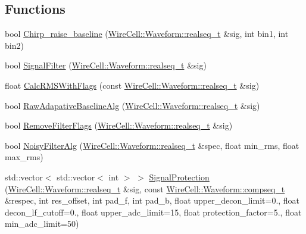 \subsection*{Functions}
\begin{DoxyCompactItemize}
\item 
bool \hyperlink{namespace_wire_cell_1_1_sig_proc_1_1_microboone_a16d44a6eccccc47fd7f7967b37f8ba61}{Chirp\+\_\+raise\+\_\+baseline} (\hyperlink{namespace_wire_cell_1_1_waveform_a479175e541c8545e87cd8063b74b6956}{Wire\+Cell\+::\+Waveform\+::realseq\+\_\+t} \&sig, int bin1, int bin2)
\item 
bool \hyperlink{namespace_wire_cell_1_1_sig_proc_1_1_microboone_a09348aad9dc69ef1d18d6145b03547ee}{Signal\+Filter} (\hyperlink{namespace_wire_cell_1_1_waveform_a479175e541c8545e87cd8063b74b6956}{Wire\+Cell\+::\+Waveform\+::realseq\+\_\+t} \&sig)
\item 
float \hyperlink{namespace_wire_cell_1_1_sig_proc_1_1_microboone_ae364f8dbc0dad92d515850a86baefb13}{Calc\+R\+M\+S\+With\+Flags} (const \hyperlink{namespace_wire_cell_1_1_waveform_a479175e541c8545e87cd8063b74b6956}{Wire\+Cell\+::\+Waveform\+::realseq\+\_\+t} \&sig)
\item 
bool \hyperlink{namespace_wire_cell_1_1_sig_proc_1_1_microboone_a05c4b5687320b38db3ada0478e9b729b}{Raw\+Adapative\+Baseline\+Alg} (\hyperlink{namespace_wire_cell_1_1_waveform_a479175e541c8545e87cd8063b74b6956}{Wire\+Cell\+::\+Waveform\+::realseq\+\_\+t} \&sig)
\item 
bool \hyperlink{namespace_wire_cell_1_1_sig_proc_1_1_microboone_a772813d4954fff2b2089d97db4bd5875}{Remove\+Filter\+Flags} (\hyperlink{namespace_wire_cell_1_1_waveform_a479175e541c8545e87cd8063b74b6956}{Wire\+Cell\+::\+Waveform\+::realseq\+\_\+t} \&sig)
\item 
bool \hyperlink{namespace_wire_cell_1_1_sig_proc_1_1_microboone_a8e98649e920ae702925434c6fe7676b9}{Noisy\+Filter\+Alg} (\hyperlink{namespace_wire_cell_1_1_waveform_a479175e541c8545e87cd8063b74b6956}{Wire\+Cell\+::\+Waveform\+::realseq\+\_\+t} \&spec, float min\+\_\+rms, float max\+\_\+rms)
\item 
std\+::vector$<$ std\+::vector$<$ int $>$ $>$ \hyperlink{namespace_wire_cell_1_1_sig_proc_1_1_microboone_a3502d22dc7280eeea95f3a2f2d52891c}{Signal\+Protection} (\hyperlink{namespace_wire_cell_1_1_waveform_a479175e541c8545e87cd8063b74b6956}{Wire\+Cell\+::\+Waveform\+::realseq\+\_\+t} \&sig, const \hyperlink{namespace_wire_cell_1_1_waveform_a7e4a8d371f774438bb360e7d1dcb583a}{Wire\+Cell\+::\+Waveform\+::compseq\+\_\+t} \&respec, int res\+\_\+offset, int pad\+\_\+f, int pad\+\_\+b, float upper\+\_\+decon\+\_\+limit=0., float decon\+\_\+lf\+\_\+cutoff=0., float upper\+\_\+adc\+\_\+limit=15, float protection\+\_\+factor=5., float min\+\_\+adc\+\_\+limit=50)

\end{DoxyCompactItemize}
